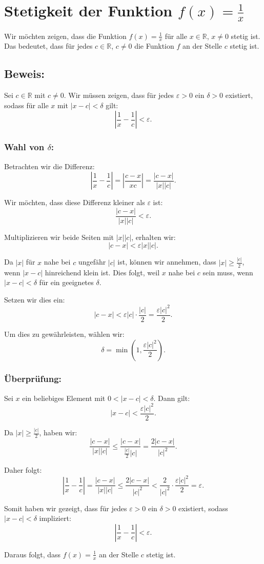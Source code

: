 \documentclass{article}
\begin{document}
\section*{Stetigkeit der Funktion $f(x) = \frac{1}{x}$}

Wir möchten zeigen, dass die Funktion $f(x) = \frac{1}{x}$ für alle $x \in \mathbb{R}$, $x \neq 0$ stetig ist. Das bedeutet, dass für jedes $c \in \mathbb{R}$, $c \neq 0$ die Funktion $f$ an der Stelle $c$ stetig ist.

\subsection*{Beweis:}

Sei $c \in \mathbb{R}$ mit $c \neq 0$. Wir müssen zeigen, dass für jedes $\varepsilon > 0$ ein $\delta > 0$ existiert, sodass für alle $x$ mit $|x - c| < \delta$ gilt:
\[
\left| \frac{1}{x} - \frac{1}{c} \right| < \varepsilon.
\]

\subsubsection*{Wahl von $\delta$:}

Betrachten wir die Differenz:
\[
\left| \frac{1}{x} - \frac{1}{c} \right| = \left| \frac{c - x}{xc} \right| = \frac{|c - x|}{|x||c|}.
\]

Wir möchten, dass diese Differenz kleiner als $\varepsilon$ ist:
\[
\frac{|c - x|}{|x||c|} < \varepsilon.
\]

Multiplizieren wir beide Seiten mit $|x||c|$, erhalten wir:
\[
|c - x| < \varepsilon |x| |c|.
\]

Da $|x|$ für $x$ nahe bei $c$ ungefähr $|c|$ ist, können wir annehmen, dass $|x| \geq \frac{|c|}{2}$, wenn $|x - c|$ hinreichend klein ist. Dies folgt, weil $x$ nahe bei $c$ sein muss, wenn $|x - c| < \delta$ für ein geeignetes $\delta$.

Setzen wir dies ein:
\[
|c - x| < \varepsilon |c| \cdot \frac{|c|}{2} = \frac{\varepsilon |c|^2}{2}.
\]

Um dies zu gewährleisten, wählen wir:
\[
\delta = \min\left(1, \frac{\varepsilon |c|^2}{2}\right).
\]

\subsubsection*{Überprüfung:}

Sei $x$ ein beliebiges Element mit $0 < |x - c| < \delta$. Dann gilt:
\[
|x - c| < \frac{\varepsilon |c|^2}{2}.
\]

Da $|x| \geq \frac{|c|}{2}$, haben wir:
\[
\frac{|c - x|}{|x||c|} \leq \frac{|c - x|}{\frac{|c|}{2} |c|} = \frac{2 |c - x|}{|c|^2}.
\]

Daher folgt:
\[
\left| \frac{1}{x} - \frac{1}{c} \right| = \frac{|c - x|}{|x||c|} \leq \frac{2 |c - x|}{|c|^2} < \frac{2}{|c|^2} \cdot \frac{\varepsilon |c|^2}{2} = \varepsilon.
\]

Somit haben wir gezeigt, dass für jedes $\varepsilon > 0$ ein $\delta > 0$ existiert, sodass $|x - c| < \delta$ impliziert:
\[
\left| \frac{1}{x} - \frac{1}{c} \right| < \varepsilon.
\]

Daraus folgt, dass $f(x) = \frac{1}{x}$ an der Stelle $c$ stetig ist.
\end{document}

